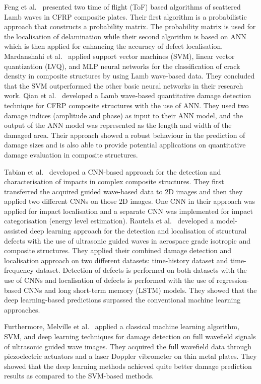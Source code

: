 Feng et al.~\cite{feng2019locating} presented two time of flight (ToF) based algorithms of scattered Lamb waves in CFRP composite plates.
Their first algorithm is a probabilistic approach that constructs a probability
matrix. 
The probability matrix is used for the localisation of delamination while
their second algorithm is based on ANN which is then applied for enhancing
the accuracy of defect localisation.
Mardanshahi et al.~\cite{mardanshahi2020detection} applied support vector machines (SVM), linear vector quantization (LVQ), and MLP neural networks for the classification of crack density in composite structures by using Lamb wave-based data.
They concluded that the SVM outperformed the other basic neural networks in
their research work.
Qian et al.~\cite{qian2020application} developed a Lamb wave-based quantitative damage detection technique for CFRP composite structures with the use of ANN.  
They used two damage indices (amplitude and phase) as input to their ANN model, and the output of the ANN model was represented as the length and width of the damaged area.  
Their approach showed a robust behaviour in the prediction of damage sizes and is also able to provide potential applications on quantitative damage evaluation in composite structures.  

Tabian et al.~\cite{Tabian2019} developed a CNN-based approach for the detection and characterisation of impacts in complex composite structures.
They first transferred the acquired guided wave-based data to 2D images and then they applied two different CNNs on those 2D images.
One CNN in their approach was applied for impact localisation and a separate CNN was implemented for impact categorisation (energy level estimation).
Rautela et al.~\cite{rautela2021ultrasonic} developed a model-assisted deep learning approach for the detection and localisation of structural defects
with the use of ultrasonic guided waves in aerospace grade isotropic and composite structures. 
They applied their combined damage detection and localisation approach on two different datasets: time-history dataset and time-frequency dataset. 
Detection of defects is performed on both datasets with the use of CNNs and localisation of defects is performed with the use of regression-based CNNs and long short-term memory (LSTM) models. 
They showed that the deep learning-based predictions surpassed the conventional machine learning approaches.

Furthermore, Melville et al.~\cite{Melville2018} applied a classical machine 
learning algorithm, SVM, and deep learning techniques for damage detection on 
full wavefield signals of ultrasonic guided wave images.
They acquired the full wavefield data through piezoelectric actuators and a laser Doppler vibrometer on thin metal plates. 
They showed that the deep learning methods achieved quite better damage prediction results as compared to the SVM-based methods. 

